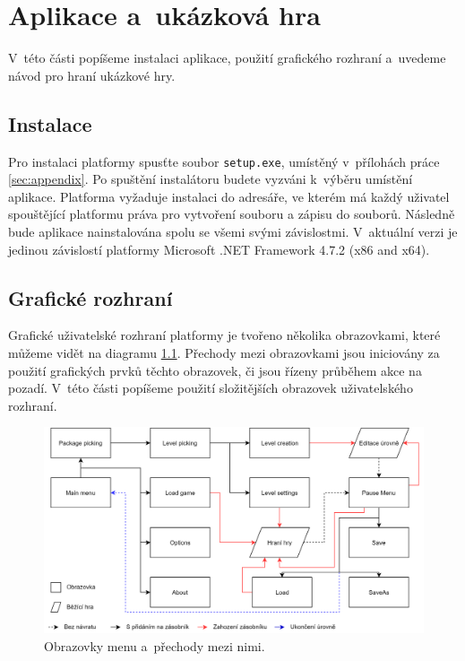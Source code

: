 \chapter{Aplikace a~ukázková hra}
V~této části popíšeme instalaci aplikace, použití grafického rozhraní a~uvedeme návod pro hraní ukázkové hry. 

\section{Instalace}
Pro instalaci platformy spusťte soubor \texttt{setup.exe}, umístěný v~přílohách práce \ref{sec:appendix}. Po spuštění instalátoru budete vyzváni k~výběru umístění aplikace. Platforma vyžaduje instalaci do adresáře, ve kterém má každý uživatel spouštějící platformu práva pro  vytvoření souboru a zápisu do souborů. Následně bude aplikace nainstalována spolu se všemi svými závislostmi. V~aktuální verzi je jedinou závislostí platformy Microsoft .NET Framework 4.7.2 (x86 and x64).

\section{Grafické rozhraní}
Grafické uživatelské rozhraní platformy je tvořeno několika obrazovkami, které můžeme vidět na diagramu \ref{fig:screen_structure2}. Přechody mezi obrazovkami jsou iniciovány za použití grafických prvků těchto obrazovek, či jsou řízeny průběhem akce na pozadí. V~této části popíšeme použití složitějších obrazovek uživatelského rozhraní.

\begin{figure}[h]
	\centering
	\includegraphics[width=\textwidth]{img/ScreenStructure.png}
	\caption{Obrazovky menu a~přechody mezi nimi.}
	\label{fig:screen_structure2}
\end{figure}

